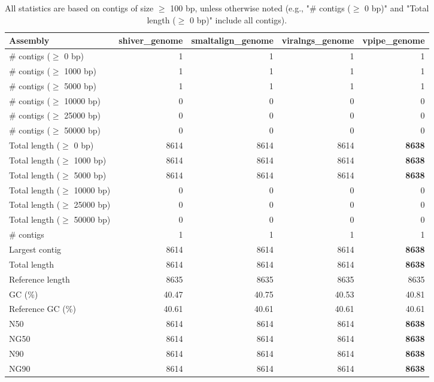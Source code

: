 \documentclass[12pt,a4paper]{article}
\begin{document}
\begin{table}[ht]
\begin{center}
\caption{All statistics are based on contigs of size $\geq$ 100 bp, unless otherwise noted (e.g., "\# contigs ($\geq$ 0 bp)" and "Total length ($\geq$ 0 bp)" include all contigs).}
\begin{tabular}{|l*{4}{|r}|}
\hline
Assembly & shiver\_genome & smaltalign\_genome & viralngs\_genome & vpipe\_genome \\ \hline
\# contigs ($\geq$ 0 bp) & 1 & 1 & 1 & 1 \\ \hline
\# contigs ($\geq$ 1000 bp) & 1 & 1 & 1 & 1 \\ \hline
\# contigs ($\geq$ 5000 bp) & 1 & 1 & 1 & 1 \\ \hline
\# contigs ($\geq$ 10000 bp) & 0 & 0 & 0 & 0 \\ \hline
\# contigs ($\geq$ 25000 bp) & 0 & 0 & 0 & 0 \\ \hline
\# contigs ($\geq$ 50000 bp) & 0 & 0 & 0 & 0 \\ \hline
Total length ($\geq$ 0 bp) & 8614 & 8614 & 8614 & {\bf 8638} \\ \hline
Total length ($\geq$ 1000 bp) & 8614 & 8614 & 8614 & {\bf 8638} \\ \hline
Total length ($\geq$ 5000 bp) & 8614 & 8614 & 8614 & {\bf 8638} \\ \hline
Total length ($\geq$ 10000 bp) & 0 & 0 & 0 & 0 \\ \hline
Total length ($\geq$ 25000 bp) & 0 & 0 & 0 & 0 \\ \hline
Total length ($\geq$ 50000 bp) & 0 & 0 & 0 & 0 \\ \hline
\# contigs & 1 & 1 & 1 & 1 \\ \hline
Largest contig & 8614 & 8614 & 8614 & {\bf 8638} \\ \hline
Total length & 8614 & 8614 & 8614 & {\bf 8638} \\ \hline
Reference length & 8635 & 8635 & 8635 & 8635 \\ \hline
GC (\%) & 40.47 & 40.75 & 40.53 & 40.81 \\ \hline
Reference GC (\%) & 40.61 & 40.61 & 40.61 & 40.61 \\ \hline
N50 & 8614 & 8614 & 8614 & {\bf 8638} \\ \hline
NG50 & 8614 & 8614 & 8614 & {\bf 8638} \\ \hline
N90 & 8614 & 8614 & 8614 & {\bf 8638} \\ \hline
NG90 & 8614 & 8614 & 8614 & {\bf 8638} \\ \hline

\end{tabular}
\end{center}
\end{table}
\end{document}
